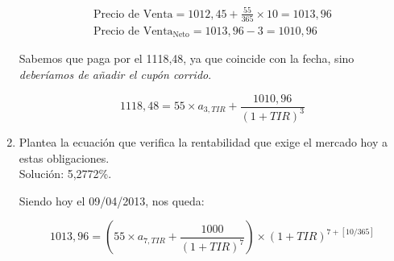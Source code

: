\begin{enumerate}[label=\textbf{\alph*)}]

    \begin{align*}
        \text{Precio de Venta} = 1012,45 + \frac{55}{365} \times 10 = 1013,96 \\
        \text{Precio de Venta}_{\text{Neto}} = 1013,96 - 3 = 1010,96
    \end{align*}

    Sabemos que paga por el 1118,48, ya que coincide con la fecha, sino \textit{deberíamos de añadir el cupón corrido}.

    \begin{equation*}
        1118,48 = 55 \times a_{3,TIR} + \frac{1010,96}{(1+TIR)^{3}}
    \end{equation*}

    \item Plantea la ecuación que verifica la rentabilidad que exige el mercado hoy a estas obligaciones.\\
    Solución: 5,2772\%.

    Siendo hoy el 09/04/2013, nos queda:

    \begin{equation*}
        1013,96 = \left(55 \times a_{7,TIR}+\frac{1000}{(1+TIR)^7}\right) \times (1+TIR)^{7+\left[10/365\right]}
    \end{equation*}

\end{enumerate}

